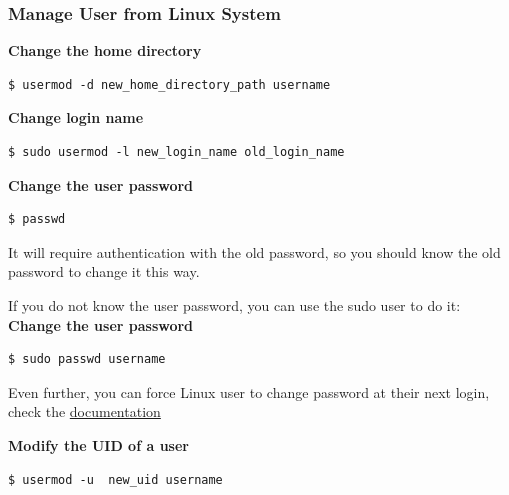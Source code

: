 \documentclass{article}
\newenvironment{blocktemplateI}[1]{%
    \tcolorbox[beamer,%
    noparskip,breakable,
    colframe=Violet,%
    colbacklower=Black,%
    title=#1]}%
    {\endtcolorbox}
\newenvironment{blocktemplateIII}[1]{%
    \tcolorbox[beamer,%
    noparskip,breakable,
    ,colframe=Red,%
    colbacklower=LimeGreen!75!LightGreen,%
    title=#1]}%
    {\endtcolorbox}
\newenvironment{codetemplate}[1][]{%
  \mybasecolorbox[#1]
  \itshape
}{%
  \endmybasecolorbox
}
\begin{document}
\subsubsection{Manage User from Linux System}
\textbf{Change the home directory}
\begin{codetemplate}{}
\begin{verbatim}
$ usermod -d new_home_directory_path username
\end{verbatim}
\end{codetemplate}

\textbf{Change login name}
\begin{codetemplate}{}
\begin{verbatim}
$ sudo usermod -l new_login_name old_login_name
\end{verbatim}
\end{codetemplate}

\textbf{Change the user password}
\begin{codetemplate}{}
\begin{verbatim}
$ passwd
\end{verbatim}
\end{codetemplate}

\begin{blocktemplateIII}{WARNING}
It will require authentication with the old password, so you should know the old password to change it this way.

If you do not know the user password, you can use the sudo user to do it:
\textbf{Change the user password}
\begin{codetemplate}{}
\begin{verbatim}
$ sudo passwd username
\end{verbatim}
\end{codetemplate}
\end{blocktemplateIII}

\begin{blocktemplateI}{NOTE}
Even further, you can force Linux user to change password at their next login, check the \href{https://www.cyberciti.biz/faq/linux-set-change-password-how-to/}{documentation}
\end{blocktemplateI}

\textbf{Modify the UID of a user}
\begin{codetemplate}{}
\begin{verbatim}
$ usermod -u  new_uid username
\end{verbatim}
\end{codetemplate}
\end{document}

